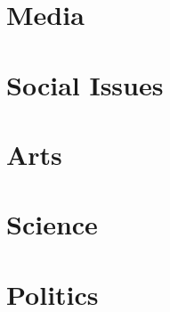 \documentclass[a4paper]{article}
\begin{document}
\begin{multicols}{2}

\section{Media}






\section{Social Issues}












\section{Arts}



\section{Science}






\section{Politics}






\end{multicols}
\end{document}
